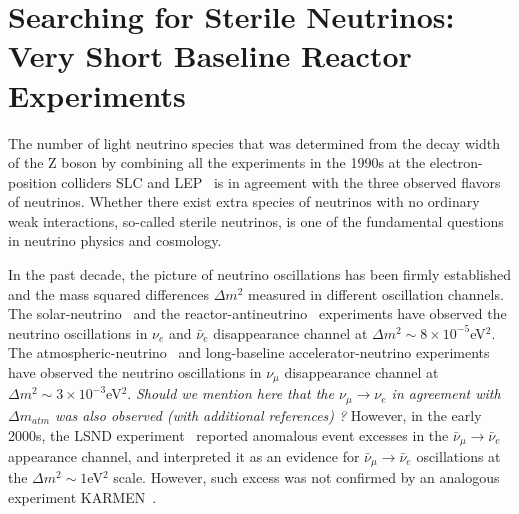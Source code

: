 \section{Searching for Sterile Neutrinos: Very Short Baseline Reactor Experiments}

The number of light neutrino species that was determined from the 
decay width of the Z boson by combining all the experiments in the 1990s at the electron-position colliders SLC and LEP~\cite{EW-2005} is in agreement with the three observed flavors of neutrinos. Whether there exist extra species of neutrinos with no ordinary weak interactions, so-called sterile neutrinos, is one of the fundamental questions in neutrino physics and cosmology.

In the past decade, the picture of neutrino oscillations has been firmly established and the mass squared differences $\Delta m^2$ 
measured in different oscillation channels. The solar-neutrino~\cite{SNO} and the reactor-antineutrino~\cite{Kamland03} experiments have observed the neutrino oscillations in $\nu_e$ and $\bar\nu_e$ disappearance channel at $\Delta m^2\sim8\times10^{-5}$eV$^2$. The atmospheric-neutrino~\cite{SuperK98} and long-baseline accelerator-neutrino experiments~\cite{K2K-2003,MINOS06} have observed the neutrino oscillations in $\nu_\mu$ disappearance channel at $\Delta m^2\sim3\times10^{-3}$eV$^2$. 
{\it Should we mention here that the $\nu_{\mu} \rightarrow \nu_e$ in agreement with $\Delta m_{atm}$ was also observed (with additional references) ?}
However, in the early 2000s, the LSND experiment~\cite{LSND2001} reported anomalous event excesses in the $\bar\nu_\mu\rightarrow\bar\nu_e$ appearance channel, and interpreted it as an evidence for $\bar\nu_\mu\rightarrow\bar\nu_e$ oscillations at the $\Delta m^2\sim1$eV$^2$ scale. However, such excess was not confirmed by an analogous experiment KARMEN~\cite{KARMEN2002}.

